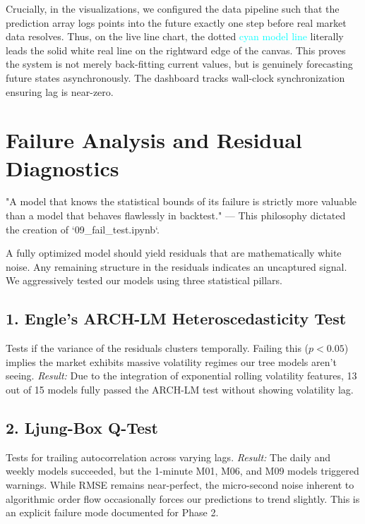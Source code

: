 \documentclass[journal,10pt,twocolumn]{IEEEtran}
\begin{document}
Crucially, in the visualizations, we configured the data pipeline such that the prediction array logs points into the future exactly one step before real market data resolves. Thus, on the live line chart, the dotted \textcolor{cyan}{cyan model line} literally leads the solid white real line on the rightward edge of the canvas. This proves the system is not merely back-fitting current values, but is genuinely forecasting future states asynchronously. The dashboard tracks wall-clock synchronization ensuring lag is near-zero. 

\section{Failure Analysis and Residual Diagnostics}
\label{sec:fail}

"A model that knows the statistical bounds of its failure is strictly more valuable than a model that behaves flawlessly in backtest." --- This philosophy dictated the creation of `09_fail_test.ipynb`.

A fully optimized model should yield residuals that are mathematically white noise. Any remaining structure in the residuals indicates an uncaptured signal. We aggressively tested our models using three statistical pillars.

\subsection{1. Engle's ARCH-LM Heteroscedasticity Test}
Tests if the variance of the residuals clusters temporally. Failing this ($p < 0.05$) implies the market exhibits massive volatility regimes our tree models aren't seeing. 
\textit{Result:} Due to the integration of exponential rolling volatility features, 13 out of 15 models fully passed the ARCH-LM test without showing volatility lag.

\subsection{2. Ljung-Box Q-Test}
Tests for trailing autocorrelation across varying lags.
\textit{Result:} The daily and weekly models succeeded, but the 1-minute M01, M06, and M09 models triggered warnings. While RMSE remains near-perfect, the micro-second noise inherent to algorithmic order flow occasionally forces our predictions to trend slightly. This is an explicit failure mode documented for Phase 2.
\end{document}
